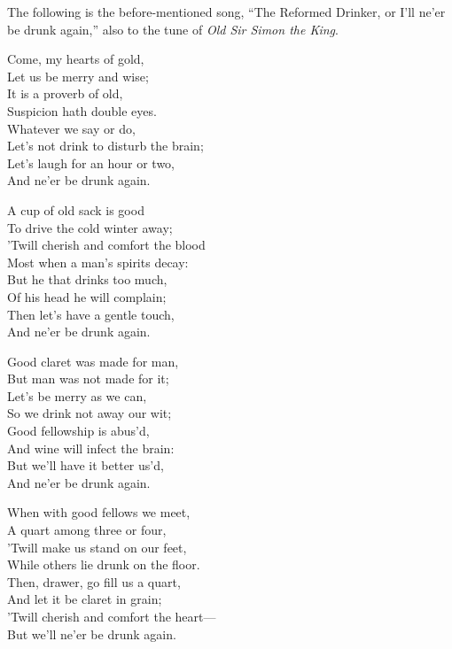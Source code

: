The following is the before-mentioned song, “The Reformed Drinker, or I’ll
ne’er be drunk again,” also to the tune of \textit{Old Sir Simon the King}.
\settowidth{\versewidth}{’Twill cherish and comfort the blood}
\begin{dcverse}\begin{altverse}
Come, my hearts of gold,\\
Let us be merry and wise;\\
It is a proverb of old,\\
Suspicion hath double eyes.\\
Whatever we say or do,\\
Let’s not drink to disturb the brain;\\
Let’s laugh for an hour or two,\\
And ne’er be drunk again.
\end{altverse}

\begin{altverse}
A cup of old sack is good\\
To drive the cold winter away;\\
’Twill cherish and comfort the blood\\
Most when a man’s spirits decay:\\
But he that drinks too much,\\
Of his head he will complain;\\
Then let’s have a gentle touch,\\
And ne’er be drunk again.
\end{altverse}

\begin{altverse}
Good claret was made for man,\\
But man was not made for it;\\
Let’s be merry as we can,\\
So we drink not away our wit;\\
Good fellowship is abus'd,\\
And wine will infect the brain:\\
But we’ll have it better us’d,\\
And ne’er be drunk again.
\end{altverse}

\begin{altverse}
When with good fellows we meet,\\
A quart among three or four,\\
’Twill make us stand on our feet,\\
While others lie drunk on the floor.\\
Then, drawer, go fill us a quart,\\
And let it be claret in grain;\\
’Twill cherish and comfort the heart—\\
But we’ll ne’er be drunk again.
\end{altverse}


\end{dcverse}
